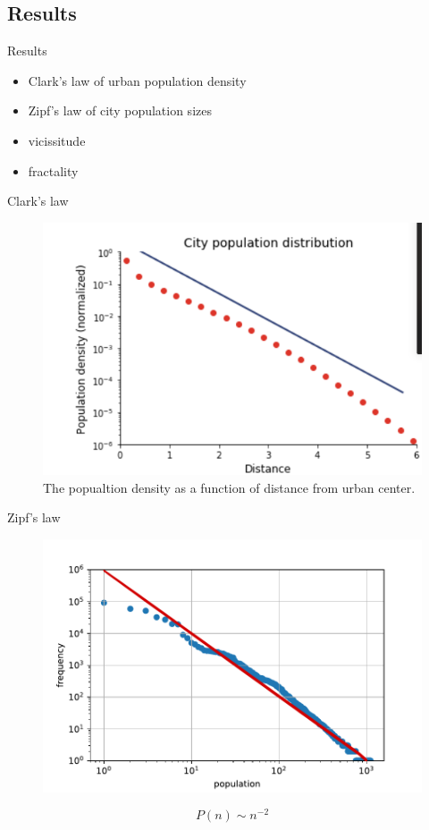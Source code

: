 \documentclass{beamer}
\begin{document}
\subsection{Results}
\begin{frame}{Results}
  \begin{itemize}
    \item Clark's law of urban population density
    \item Zipf's law of city population sizes
    \item vicissitude
    \item fractality
  \end{itemize}
\end{frame}

\begin{frame}{Clark's law}
  \begin{figure}
    \includegraphics[width = 0.8\linewidth]{pics/clark.PNG}
    \caption{The popualtion density as a function of distance from urban center.}
  \end{figure}
\end{frame}

\begin{frame}{Zipf's law}
  \begin{figure}
    \includegraphics[width = 0.8\linewidth]{pics/zipf.pdf}
  \end{figure}
  $$P(n)\sim n^{-2}$$
\end{frame}
\end{document}
